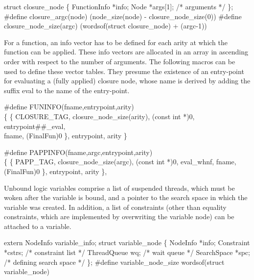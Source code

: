 struct closure_node \{
    FunctionInfo *info;
    Node         *args[1];              /* arguments */
\};
#define closure_argc(node)      (node_size(node) - closure_node_size(0))
#define closure_node_size(argc) (wordsof(struct closure_node) + (argc-1))

\nwendcode{}\nwdocspar
For a function, an info vector has to be defined for each arity at
which the function can be applied. These info vectors are allocated in
an array in ascending order with respect to the number of arguments.
The following macros can be used to define these vector tables. They
presume the existence of an entry-point for evaluating a (fully
applied) closure node, whose name is derived by adding the suffix
{\Tt{}{\_}eval\nwendquote} to the name of the entry-point.

\nwenddocs{}\plusendmoddef\nwstartdeflinemarkup{}\nwenddeflinemarkup
#define FUNINFO(fname,entrypoint,arity) \\
\{ \{ CLOSURE_TAG, closure_node_size(arity), (const int *)0, entrypoint##_eval, \\
    fname, (FinalFun)0 \}, entrypoint, arity \}

#define PAPPINFO(fname,argc,entrypoint,arity) \\
\{ \{ PAPP_TAG, closure_node_size(argc), (const int *)0, eval_whnf, fname, \\
    (FinalFun)0 \}, entrypoint, arity \},

\nwendcode{}\nwdocspar
Unbound logic variables comprise a list of suspended threads, which
must be woken after the variable is bound, and a pointer to the search
space in which the variable was created. In addition, a list of
constraints (other than equality constraints, which are implemented by
overwriting the variable node) can be attached to a variable.

\nwenddocs{}\plusendmoddef\nwstartdeflinemarkup{}\nwenddeflinemarkup
extern NodeInfo variable_info;
struct variable_node \{
    NodeInfo    *info;
    Constraint  *cstrs;         /* constraint list */
    ThreadQueue wq;             /* wait queue */
    SearchSpace *spc;           /* defining search space */
\};
#define variable_node_size      wordsof(struct variable_node)

